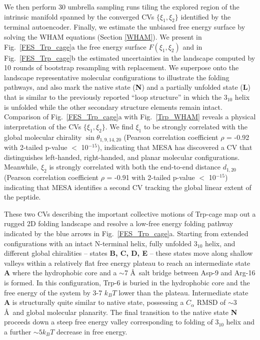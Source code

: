 \documentclass[12pt]{article}
\newcommand*{\blauw}[1]{#1}
\begin{document}
We then perform 30 umbrella sampling runs tiling the explored region of the intrinsic manifold spanned by the converged CVs $\{\xi_1,\xi_2\}$ identified by the terminal autoencoder. Finally, we estimate the unbiased free energy surface by solving the WHAM equations (\blauw{Section \ref{WHAM}}). We present in \blauw{Fig.~\ref{FES_Trp_cage}a} the free energy surface $F(\xi_1,\xi_2)$ and in \blauw{Fig.~\ref{FES_Trp_cage}b} the estimated uncertainties in the landscape computed by 10 rounds of bootstrap resampling with replacement. We superpose onto the landscape representative molecular configurations to illustrate the folding pathways, and also mark the native state (\textbf{N}) and a partially unfolded state (\textbf{L}) that is similar to the previously reported ``loop structure'' in which the $3_{10}$ helix is unfolded while the other secondary structure elements remain intact\cite{kim2015systematic,juraszek2006sampling,kannan2009folding,shao2012enhanced}.  Comparison of \blauw{Fig.~\ref{FES_Trp_cage}a} with \blauw{Fig.~\ref{Trp_WHAM}} reveals a physical interpretation of the CVs $\{\xi_1,\xi_2\}$. We find $\xi_1$ to be strongly correlated with the global molecular chirality $\sin \theta_{1,9,14,20}$ (Pearson correlation coefficient $\rho$ = -0.92 with 2-tailed p-value $<$ 10$^{-15}$), indicating that MESA has discovered a CV that distinguishes left-handed, right-handed, and planar molecular configurations. Meanwhile, $\xi_2$ is strongly correlated with both the end-to-end distance $d_{1,20}$ (Pearson correlation coefficient $\rho$ = -0.91 with 2-tailed p-value $<$ 10$^{-15}$) indicating that MESA identifies a second CV tracking the global linear extent of the peptide. 

These two CVs describing the important collective motions of Trp-cage map out a rugged 2D folding landscape and resolve a low-free energy folding pathway indicated by the blue arrows in \blauw{Fig.~\ref{FES_Trp_cage}a}. Starting from extended configurations with an intact N-terminal helix, fully unfolded $3_{10}$ helix, and different global chiralities -- states \textbf{B, C, D, E} -- these states move along shallow valleys within a relatively flat free energy plateau to reach an intermediate state \textbf{A} where the hydrophobic core and a $\sim$7 \AA\ salt bridge between Asp-9 and Arg-16 is formed. In this configuration, Trp-6 is buried in the hydrophobic core and the free energy of the system by 3-7 $k_B T$ lower than the plateau. Intermediate state \textbf{A} is structurally quite similar to native state, possessing a $C_\alpha$ RMSD of $\sim$3 \AA\ and global molecular planarity. The final transition to the native state \textbf{N} proceeds down a steep free energy valley corresponding to folding of $3_{10}$ helix and a further $\sim 5k_B T$ decrease in free energy.
\end{document}
